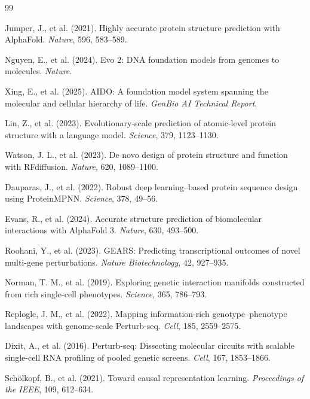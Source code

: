\documentclass[11pt]{article}
\begin{document}

\begin{thebibliography}{99}

Jumper, J., et al. (2021). Highly accurate protein structure prediction with AlphaFold. \textit{Nature}, 596, 583--589.

Nguyen, E., et al. (2024). Evo 2: DNA foundation models from genomes to molecules. \textit{Nature}.

Xing, E., et al. (2025). AIDO: A foundation model system spanning the molecular and cellular hierarchy of life. \textit{GenBio AI Technical Report}.

Lin, Z., et al. (2023). Evolutionary-scale prediction of atomic-level protein structure with a language model. \textit{Science}, 379, 1123--1130.

Watson, J. L., et al. (2023). De novo design of protein structure and function with RFdiffusion. \textit{Nature}, 620, 1089--1100.

Dauparas, J., et al. (2022). Robust deep learning--based protein sequence design using ProteinMPNN. \textit{Science}, 378, 49--56.

Evans, R., et al. (2024). Accurate structure prediction of biomolecular interactions with AlphaFold 3. \textit{Nature}, 630, 493--500.

Roohani, Y., et al. (2023). GEARS: Predicting transcriptional outcomes of novel multi-gene perturbations. \textit{Nature Biotechnology}, 42, 927--935.

Norman, T. M., et al. (2019). Exploring genetic interaction manifolds constructed from rich single-cell phenotypes. \textit{Science}, 365, 786--793.

Replogle, J. M., et al. (2022). Mapping information-rich genotype--phenotype landscapes with genome-scale Perturb-seq. \textit{Cell}, 185, 2559--2575.

Dixit, A., et al. (2016). Perturb-seq: Dissecting molecular circuits with scalable single-cell RNA profiling of pooled genetic screens. \textit{Cell}, 167, 1853--1866.

Schölkopf, B., et al. (2021). Toward causal representation learning. \textit{Proceedings of the IEEE}, 109, 612--634.


\end{thebibliography}
\end{document}
